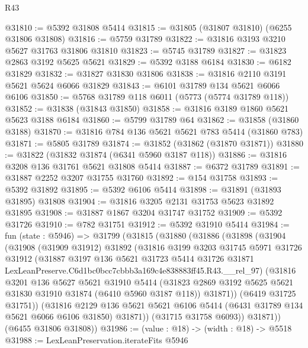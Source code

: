 \begin{lexlean}{R43}
\begin{coremodule}
@31810 := @5392 @31808 @5414
@31815 := @31805 (@31807 @31810) (@6255 @31806 @31808)
@31816 := @5759 @31789
@31822 := @31816 @3193 @3210 @5627 @31763 @31806 @31810
@31823 := @5745 @31789
@31827 := @31823 @2863 @3192 @5625 @5621
@31829 := @5392 @3188 @6184
@31830 := @6182 @31829
@31832 := @31827 @31830 @31806
@31838 := @31816 @2110 @3191 @5621 @5624 @6066 @31829
@31843 := @6101 @31789 @134 @5621 @6066 @6106
@31850 := @5768 @31789 @118 @6011 (@5773 (@5774 @31789 @118))
@31852 := @31838 (@31843 @31850)
@31858 := @31816 @3189 @1860 @5621 @5623 @3188 @6184
@31860 := @5799 @31789 @64
@31862 := @31858 (@31860 @3188)
@31870 := @31816 @784 @136 @5621 @5621 @783 @5414 (@31860 @783)
@31871 := @5805 @31789
@31874 := @31852 (@31862 (@31870 @31871))
@31880 := @31822 (@31832 @31874 (@6341 @5960 @3187 @118))
@31886 := @31816 @3208 @136 @31761 @5621 @31808 @5414
@31887 := @6372 @31789
@31891 := @31887 @2252 @3207 @31755 @31760
@31892 := @154 @31758
@31893 := @5392 @31892
@31895 := @5392 @6106 @5414
@31898 := @31891 (@31893 @31895) @31808
@31904 := @31816 @3205 @2131 @31753 @5623 @31892 @31895
@31908 := @31887 @1867 @3204 @31747 @31752
@31909 := @5392 @31726
@31910 := @782 @31751
@31912 := @5392 @31910 @5414
@31984 := fun (state : @5946) =>
  @31799
    (@31815
      (@31880
        (@31886
          (@31898
            (@31904
              (@31908
                (@31909 @31912)
                @31892
                (@31816
                  @3199
                  @3203
                  @31745
                  @5971
                  @31726
                  @31912
                  (@31887
                    @3197
                    @136
                    @5621
                    @31723
                    @5414
                    @31726
                    @31871
                    LexLeanPreserve.C6d1bc0bcc7cbbb3a169c4e838883ff45.R43.__rel_97)
                  (@31816
                    @3201
                    @136
                    @5627
                    @5621
                    @31910
                    @5414
                    (@31823 @2869 @3192 @5625 @5621 @31830 @31910 @31874 (@6410 @5960 @3187 @118))
                    @31871))
                (@6419 @31725 @31751))
              (@31816
                @2129
                @136
                @5621
                @5621
                @6106
                @5414
                (@6431 @31789 @134 @5621 @6066 @6106 @31850)
                @31871))
            (@31715 @31758 @6093))
          @31871))
      (@6455 @31806 @31808))
@31986 := (value : @18) -> (width : @18) -> @5518
@31988 := LexLeanPreservation.iterateFits @5946

\end{coremodule}
\end{lexlean}
